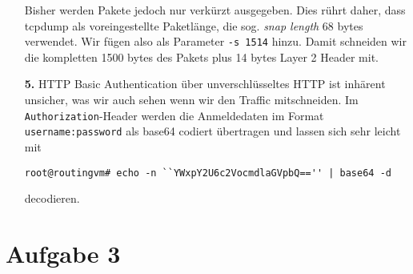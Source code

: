 \documentclass[10pt,a4paper]{article}
\begin{document}
\begin{enumerate}
                      Bisher werden Pakete jedoch nur verkürzt ausgegeben. Dies
                      rührt daher, dass tcpdump als voreingestellte Paketlänge,
                      die sog. \textit{snap length} 68 bytes verwendet. Wir fügen
                      also als Parameter \texttt{-s 1514} hinzu. Damit schneiden
                      wir die kompletten 1500 bytes des Pakets plus 14 bytes Layer 2
                      Header mit.

        \item[\bf 5.] HTTP Basic Authentication über unverschlüsseltes HTTP ist
                      inhärent unsicher, was wir auch sehen wenn wir den Traffic
                      mitschneiden. Im \texttt{Authorization}-Header werden die
                      Anmeldedaten im Format \texttt{username:password} als base64
                      codiert übertragen und lassen sich sehr leicht mit
                      \begin{lstlisting}[style=BashInputStyle]
root@routingvm# echo -n ``YWxpY2U6c2VocmdlaGVpbQ=='' | base64 -d
                      \end{lstlisting}
                      decodieren.
    \end{enumerate}

\setcounter{section}{3}
\setcounter{subsection}{0}
\section*{Aufgabe 3}
\end{document}
